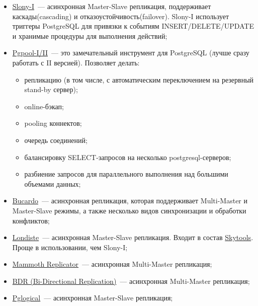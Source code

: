 \begin{itemize}
  \item \href{http://www.slony.info/}{Slony-I}~--- асинхронная Master-Slave репликация, поддерживает каскады(cascading) и отказоустойчивость(failover). Slony-I использует триггеры PostgreSQL для привязки к событиям INSERT/DELETE/UPDATE и хранимые процедуры для выполнения действий;

  \item \href{http://pgpool.projects.postgresql.org/}{Pgpool-I/II}~--- это замечательный инструмент для PostgreSQL (лучше сразу работать с II версией). Позволяет делать:
  \begin{itemize}
    \item репликацию (в том числе, с автоматическим переключением на резервный stand-by сервер);
    \item online-бэкап;
    \item pooling коннектов;
    \item очередь соединений;
    \item балансировку SELECT-запросов на несколько postgresql-серверов;
    \item разбиение запросов для параллельного выполнения над большими объемами данных;
  \end{itemize}

  \item \href{http://bucardo.org/}{Bucardo}~--- асинхронная репликация, которая поддерживает Multi-Master и Master-Slave режимы, а также несколько видов синхронизации и обработки конфликтов;

  \item \href{http://skytools.projects.postgresql.org/doc/londiste.ref.html}{Londiste}~--- асинхронная Master-Slave репликация. Входит в состав \href{http://pgfoundry.org/projects/skytools/}{Skytools}. Проще в использовании, чем Slony-I;

  \item \href{http://www.commandprompt.com/products/mammothreplicator/}{Mammoth Replicator}~--- асинхронная Multi-Master репликация;

  \item \href{http://2ndquadrant.com/en/resources/bdr/}{BDR (Bi-Directional Replication)}~--- асинхронная Multi-Master репликация;

  \item \href{http://2ndquadrant.com/en/resources/pglogical/}{Pglogical}~--- асинхронная Master-Slave репликация;
\end{itemize}

